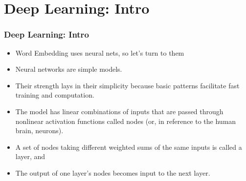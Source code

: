 \documentclass[
  shownotes,
  xcolor={svgnames},
  hyperref={colorlinks,citecolor=DarkBlue,linkcolor=DarkRed,urlcolor=DarkBlue}
  , aspectratio=169]{beamer}
\begin{document}
\section{Deep Learning: Intro}
\begin{frame}
\frametitle{Deep Learning: Intro}

\begin{itemize}
    \item Word Embedding uses neural nets, so let's turn to them
    \medskip
  \item Neural networks are simple models.
  \medskip
  \item Their strength lays in their simplicity because basic patterns facilitate fast training and computation. 
  \medskip
  \item The model has linear combinations of inputs that are passed through nonlinear activation functions called nodes (or, in reference to the human brain, neurons). 
  \medskip
  \item A set of nodes taking different weighted sums of the same inputs is called a layer, and
  \medskip
  \item  The output of one layer's nodes becomes input to the next layer. 
\end{itemize}

\end{frame}
\end{document}
